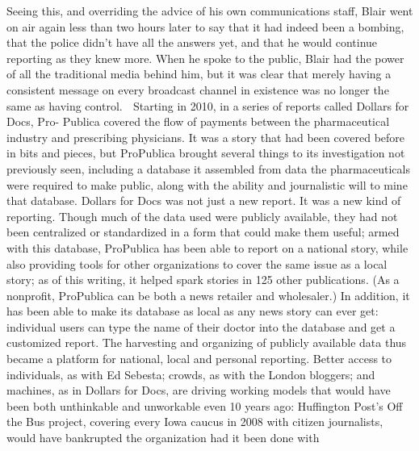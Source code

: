 Seeing this, and overriding the advice of his own communications
staff, Blair went on air again less than two hours later to say that it had
indeed been a bombing, that the police didn’t have all the answers yet,
and that he would continue reporting as they knew more. When he
spoke to the public, Blair had the power of all the traditional media
behind him, but it was clear that merely having a consistent message
on every broadcast channel in existence was no longer the same as
having control.
 Starting in 2010, in a series of reports called Dollars for Docs, Pro-
Publica covered the flow of payments between the pharmaceutical
industry and prescribing physicians. It was a story that had been
covered before in bits and pieces, but ProPublica brought several
things to its investigation not previously seen, including a database it
assembled from data the pharmaceuticals were required to make public,
along with the ability and journalistic will to mine that database.
Dollars for Docs was not just a new report. It was a new kind of reporting.
Though much of the data used were publicly available, they
had not been centralized or standardized in a form that could make
them useful; armed with this database, ProPublica has been able to report
on a national story, while also providing tools for other organizations
to cover the same issue as a local story; as of this writing, it helped
spark stories in 125 other publications. (As a nonprofit, ProPublica can
be both a news retailer and wholesaler.) In addition, it has been able
to make its database as local as any news story can ever get: individual
users can type the name of their doctor into the database and get a
customized report. The harvesting and organizing of publicly available
data thus became a platform for national, local and personal reporting.
Better access to individuals, as with Ed Sebesta; crowds, as with the London
bloggers; and machines, as in Dollars for Docs, are driving working models that
would have been both unthinkable and unworkable even 10 years ago: Huffington
Post’s Off the Bus project, covering every Iowa caucus in 2008 with citizen
journalists, would have bankrupted the organization had it been done with

